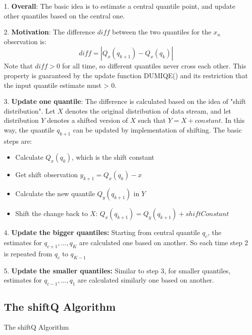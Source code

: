 1. \textbf{Overall}: The basic idea is to estimate a central quantile point, and update other quantiles based on the central one. 

2. \textbf{Motivation}: The difference $diff$ between the two quantiles for the $x_{n}$ observation is:
$$
diff = |Q_x(q_{k+1}) - Q_x(q_k)|
$$
    Note that $diff > 0$ for all time, so different quantiles never cross each other. This property is guaranteed by the update function DUMIQE() and its restriction that the input quantile estimate must > 0.

3. \textbf{Update one quantile}: The difference is calculated based on the idea of "shift distribution". Let $X$ denotes the original distribution of data stream, and let distribution $Y$ denotes a shifted version of $X$ such that $Y = X + constant$. In this way, the quantile $q_{k+1}$ can be updated by implementation of shifting. The basic steps are:
\begin{itemize}
    \item Calculate $Q_x(q_k)$, which is the shift constant
    \item Get shift observation $y_{k+1} =  Q_x(q_k) - x$
    \item Calculate the new quantile $Q_y(q_{k+1})$ in $Y$
    \item Shift the change back to $X$: $Q_x(q_{k+1}) = Q_y(q_{k+1}) + shiftConstant$
\end{itemize}

4. \textbf{Update the bigger quantiles:} Starting from central quantile $q_c$, the estimates for $q_{c+1}, ..., q_{K}$ are calculated one based on another. So each time step 2 is repeated from $q_c$ to $q_{K-1}$

5. \textbf{Update the smaller quantiles:} Similar to step 3, for smaller quantiles, estimates for $q_{c-1}, ..., q_{1}$ are calculated similarly one based on another.

\subsection{The shiftQ Algorithm}
\begin{algorithm}
    \caption{The shiftQ Algorithm}\label{alg:multi_shiftQ}
        \begin{algorithmic}[1]
        \end{algorithmic}
\end{algorithm}
